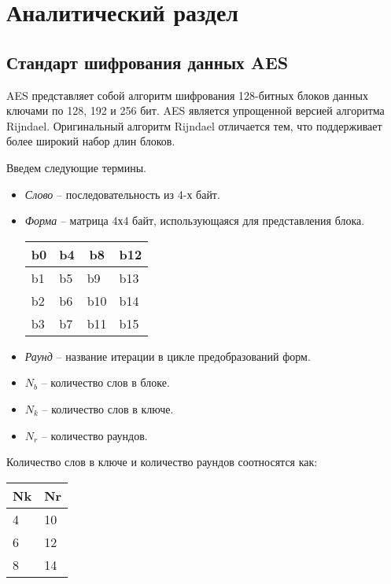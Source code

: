\section{Аналитический раздел}

\subsection{Стандарт шифрования данных AES}

AES представляет собой алгоритм шифрования 128-битных блоков данных ключами по 128, 192 и 256 бит. AES является упрощенной версией алгоритма Rijndael. Оригинальный алгоритм Rijndael отличается тем, что поддерживает более широкий набор длин блоков.

Введем следующие термины.
\begin{itemize}
	\item \textit{Слово} -- последовательность из 4-х байт.
	\item \textit{Форма} -- матрица 4х4 байт, использующаяся для представления блока.
	\begin{table}[H]
		\centering
		\begin{tabular}{|l|l|l|l|}
			\hline
			\multicolumn{1}{|c|}{b0} & \multicolumn{1}{c|}{b4} & \multicolumn{1}{c|}{b8} & \multicolumn{1}{c|}{b12} \\ \hline
			b1                       & b5                      & b9                      & b13                      \\ \hline
			b2                       & b6                      & b10                     & b14                      \\ \hline
			b3                       & b7                      & b11                     & b15                      \\ \hline
		\end{tabular}
	\end{table}
	\item \textit{Раунд} -- название итерации в цикле предобразований форм.
	\item \textit{$N_b$} -- количество слов в блоке.
	\item \textit{$N_k$} -- количество слов в ключе.
	\item \textit{$N_r$} -- количество раундов.
\end{itemize}

Количество слов в ключе и количество раундов соотносятся как:

\begin{table}[H]
	\centering
	\begin{tabular}{|l|l|}
		\hline
		\multicolumn{1}{|c|}{Nk} & \multicolumn{1}{c|}{Nr} \\ \hline
		4                        & 10                      \\ \hline
		6                        & 12                      \\ \hline
		8                        & 14                      \\ \hline
	\end{tabular}
\end{table}

